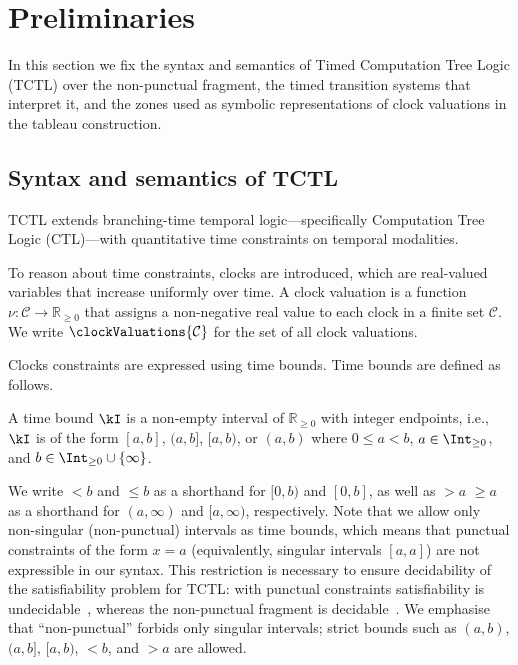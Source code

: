 
\section{Preliminaries}\label{sec:prelim}
In this section we fix the syntax and semantics of Timed Computation Tree Logic (TCTL) over the non-punctual fragment, the timed transition systems that interpret it, and the zones used as symbolic representations of clock valuations in the tableau construction.



\subsection{Syntax and semantics of TCTL}

TCTL extends branching-time temporal logic—specifically Computation Tree Logic (CTL)—with quantitative time constraints on temporal modalities. 


To reason about time constraints, {clocks} are introduced, which are real-valued variables that increase uniformly over time. A {clock valuation} is a function $\nu : \mathcal{C} \to \mathbb{R}_{\ge 0}$ that assigns a non-negative real value to each clock in a finite set $\mathcal{C}$. We write $\clockValuations{\mathcal{C}}$ for the set of all clock valuations.





Clocks constraints are expressed using time bounds. Time bounds are defined as follows.
\begin{definition}\label{def:time_bounds}
    A time bound $\kI$ is a non-empty interval of $\mathbb{R}_{\ge 0}$ with {integer} endpoints, i.e., $\kI$ is of the form $[a,b]$, $(a,b]$, $[a,b)$, or $(a,b)$ where $0 \le a < b$, $a \in \Int_{\ge 0}$, and $b \in \Int_{\ge 0} \cup \{\infty\}$.
\end{definition}


We write $<b$ and $\leq b$ as a shorthand for $[0,b)$ and $[0,b]$, as well as $>a$ $\geq a$ as a shorthand for $(a,\infty)$ and $[a,\infty)$, respectively. Note that we allow only non-singular (non-punctual) intervals as time bounds, which means that punctual constraints of the form $x=a$ (equivalently, singular intervals $[a,a]$) are not expressible in our syntax. This restriction is necessary to ensure decidability of the satisfiability problem for TCTL: with punctual constraints satisfiability is undecidable~\cite{AlurCourcoubetisDill1990}, whereas the non-punctual fragment is decidable~\cite{fsttcs2000-LN,LaTorreNapoli2001TimedTreeAutomata}. We emphasise that ``non-punctual'' forbids only singular intervals; {strict} bounds such as $(a,b)$, $(a,b]$, $[a,b)$, $<b$, and $>a$ are allowed.



